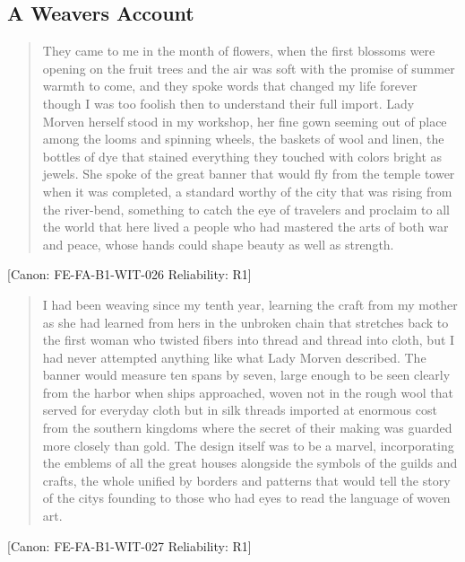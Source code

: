 \subsection{A Weaver\textquotesingle s Account}\label{a-weavers-account}

\begin{quote}
They came to me in the month of flowers, when the first blossoms were
opening on the fruit trees and the air was soft with the promise of
summer warmth to come, and they spoke words that changed my life forever
though I was too foolish then to understand their full import. Lady
Morven herself stood in my workshop, her fine gown seeming out of place
among the looms and spinning wheels, the baskets of wool and linen, the
bottles of dye that stained everything they touched with colors bright
as jewels. She spoke of the great banner that would fly from the temple
tower when it was completed, a standard worthy of the city that was
rising from the river-bend, something to catch the eye of travelers and
proclaim to all the world that here lived a people who had mastered the
arts of both war and peace, whose hands could shape beauty as well as
strength.
\end{quote}

{[}Canon: FE-FA-B1-WIT-026 \textbar{} Reliability: R1{]}

\begin{quote}
I had been weaving since my tenth year, learning the craft from my
mother as she had learned from hers in the unbroken chain that stretches
back to the first woman who twisted fibers into thread and thread into
cloth, but I had never attempted anything like what Lady Morven
described. The banner would measure ten spans by seven, large enough to
be seen clearly from the harbor when ships approached, woven not in the
rough wool that served for everyday cloth but in silk threads imported
at enormous cost from the southern kingdoms where the secret of their
making was guarded more closely than gold. The design itself was to be a
marvel, incorporating the emblems of all the great houses alongside the
symbols of the guilds and crafts, the whole unified by borders and
patterns that would tell the story of the city\textquotesingle s
founding to those who had eyes to read the language of woven art.
\end{quote}

{[}Canon: FE-FA-B1-WIT-027 \textbar{} Reliability: R1{]}


